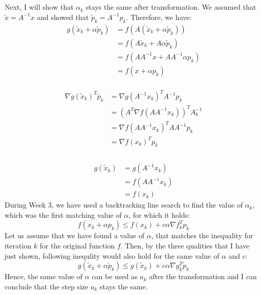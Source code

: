 \documentclass[a4paper]{article}
\begin{document}
\subsection{}
Next, I will show that $\alpha_k$ stays the same after transformation.
We assumed that $\tilde{x} =  A^{-1}x$ and showed that $\tilde{p}_k=A^{-1}p_k$.
Therefore, we have:
\[
\begin{aligned}
  g(\tilde{x}_k+\alpha \tilde{p}_k)
  &= f(A(\tilde{x}_k+\alpha \tilde{p}_k))\\
  &= f(A\tilde{x}_k + A\alpha \tilde{p}_k)\\
  &= f(AA^{-1}x + AA^{-1} \alpha p_k)\\
  &= f(x + \alpha p_k)
\end{aligned}
\]\\
\[
\begin{aligned}
  \nabla g(\tilde{x}_k)^T\tilde{p}_k
  &=\nabla g(A^{-1}x_k)^TA^{-1}p_k\\
   &= (A^T\nabla f(AA^{-1}x_k))^TA^{-1}_k\\
   &=\nabla f(AA^{-1}x_k)^TAA^{-1}p_k\\
   &= \nabla f(x_k)^Tp_k\\
\end{aligned}
\]\\
\[
\begin{aligned}
  g(\tilde{x}_k)
  &= g(A^{-1}x_k)\\
  &= f(AA^{-1}x_k)\\
  &= f(x_k)
\end{aligned}
\]
During Week 3, we have used a backtracking line search to find the value of $\alpha_k$,
which was the first matching value of $\alpha$, for which it holds:
\[
f(x_k + \alpha p_k) \leq f(x_k) + c\alpha\nabla f_k^Tp_k
\]
Let us assume that we have found a value of $\alpha$, that matches the
inequality for iteration $k$ for the original function $f$. Then, by the three
qualities that I have just shown, following inequlity would also hold for the
same value of $\alpha$ and $c$:
\[
g(\tilde{x}_k + \alpha \tilde{p}_k) \leq g(\tilde{x}_k) + c\alpha\nabla g_k^T\tilde{p}_k
\]
Hence, the same value of $\alpha$ can be used as $a_k$ after the transformation
and I can conclude that the step size $a_k$ stays the same.
\end{document}

